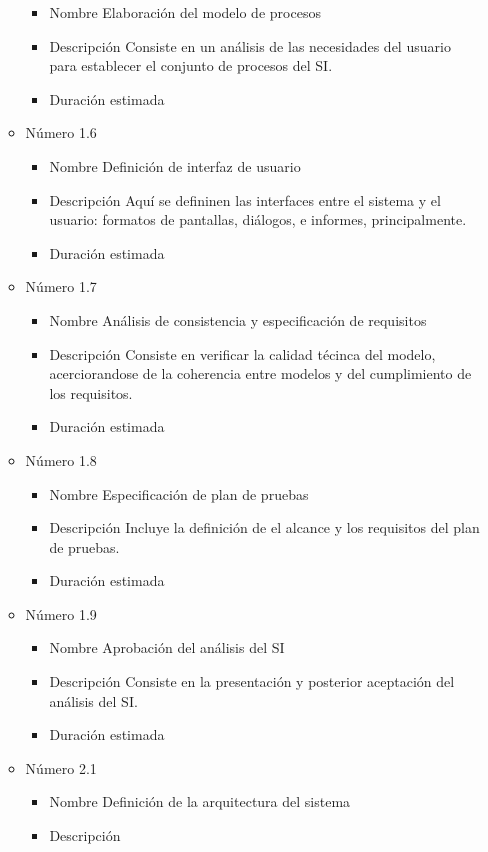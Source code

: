 \documentclass[11pt,a4paper,spanish,twoside]{report}
\begin{document}
\begin{itemize}
\begin{itemize}
\begin{itemize}
\item{Nombre} Elaboración del modelo de procesos
\item{Descripción} Consiste en un análisis de las necesidades del usuario
  para establecer el conjunto de procesos del SI.
\item{Duración estimada} 
\end{itemize}
\item{Número} 1.6
\begin{itemize}
\item{Nombre} Definición de interfaz de usuario
\item{Descripción} Aquí se defininen las interfaces entre el sistema y el 
usuario: formatos de pantallas, diálogos, e informes, principalmente.

\item{Duración estimada} 
\end{itemize}
\item{Número} 1.7
\begin{itemize}
\item{Nombre} Análisis de consistencia y especificación de requisitos
\item{Descripción} Consiste en verificar la calidad técinca del modelo,
  acerciorandose de la coherencia entre modelos y del cumplimiento de los requisitos.
\item{Duración estimada} 
\end{itemize}
\item{Número} 1.8
\begin{itemize}
\item{Nombre} Especificación de plan de pruebas
\item{Descripción} Incluye la definición de el alcance y los requisitos del
  plan de pruebas.
\item{Duración estimada} 
\end{itemize}
\item{Número} 1.9
\begin{itemize}
\item{Nombre} Aprobación del análisis del SI
\item{Descripción} Consiste en la presentación y posterior aceptación del
  análisis del SI.
\item{Duración estimada} 
\end{itemize}
\item{Número} 2.1
\begin{itemize}
\item{Nombre} Definición de la arquitectura del sistema
\item{Descripción}

\end{itemize}
\end{itemize}
\end{itemize}
\end{document}
